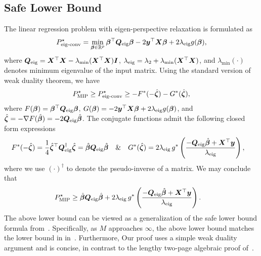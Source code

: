 \subsection{Safe Lower Bound}
\label{appendix_sec:safe_lower_bound_more_discussions}

The linear regression problem with eigen-perspective relaxation is formulated as
\begin{align*}
    P^\star_{\text{eig-conv}} = \min_{\bm{\beta} \in \mathbb{R}^p} \bm{\beta}^\top \bm{Q}_{\text{eig}} \bm{\beta} - 2\bm{y}^\top \bm{X} \bm{\beta} +  2 \lambda_{\text{eig}} g(\bm{\beta}),
\end{align*}
where $\bm{Q}_{\text{eig}} = \bm{X}^\top \bm{X} - \lambda_{\text{min}}(\bm{X}^\top \bm{X}) \bm{I}$, $\lambda_{\text{eig}} = \lambda_2 + \lambda_{\text{min}}(\bm{X}^\top \bm{X})$, and $\lambda_{\text{min}}(\cdot)$ denotes minimum eigenvalue of the input matrix.
Using the standard version of weak duality theorem, we have
\begin{align*}
    P_{\text{MIP}}^\star \geq P_{\text{eig-conv}}^\star \geq - F^*(-\hat{\bm{\zeta}}) - G^*(\hat{\bm{\zeta}}),
\end{align*}
where $F(\bm{\beta})= \bm{\beta}^\top \bm{Q}_{\text{eig}} \bm{\beta}$, $G(\bm{\beta}) = -2\bm{y}^\top \bm{X} \bm{\beta} + 2 \lambda_{\text{eig}} g(\bm{\beta})$, and $\hat{\bm{\zeta}} = -\nabla F(\hat{\bm{\beta}}) = -2\bm{Q}_{\text{eig}} \hat{\bm{\beta}}$.
The conjugate functions admit the following closed form expressions
\begin{align*}
    F^*(-\hat{\bm{\zeta}}) &= \frac{1}{4} \hat{\bm{\zeta}}^\top \bm{Q}_{\text{eig}}^{\dagger} \hat{\bm{\zeta}} = \hat{\bm{\beta}} \bm{Q}_{\text{eig}} \hat{\bm{\beta}} \quad \& \quad G^*(\hat{\bm{\zeta}}) = 2\lambda_{\text{eig}} \, g^* \left(\frac{-\bm{Q}_{\text{eig}}\hat{\bm{\beta}} +  \bm{X}^\top \bm{y}}{\lambda_{\text{eig}}} \right), 
\end{align*}
where we use $(\cdot)^{\dagger}$ to denote the pseudo-inverse of a matrix. We may conclude that
\begin{align*}
    P_{\text{MIP}}^\star & \geq \hat{\bm{\beta}} \bm{Q}_{\text{eig}} \hat{\bm{\beta}} + 2\lambda_{\text{eig}} \, g^* \left(\frac{-\bm{Q}_{\text{eig}}\hat{\bm{\beta}} +  \bm{X}^\top \bm{y}}{\lambda_{\text{eig}}}\right).
\end{align*}
The above lower bound can be viewed as a generalization of the safe lower bound formula from~\citep[Theorem~3.1]{liu2024okridge}. Specifically, as $M$ approaches $\infty$, the above lower bound matches the lower bound in in~\citep[Theorem~3.1]{liu2024okridge}. 
Furthermore, Our proof uses a simple weak duality argument and is concise, in contrast to the lengthy two-page algebraic proof of~\citep[Theorem~3.1]{liu2024okridge}.
